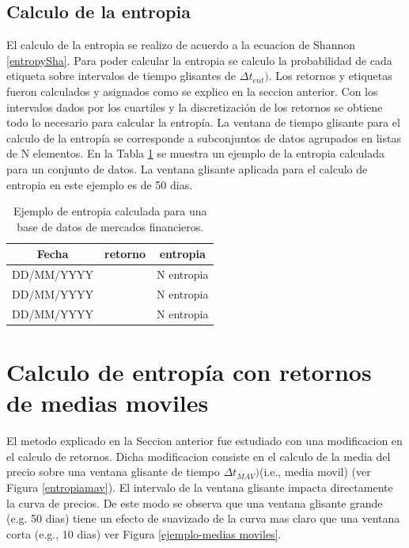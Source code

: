\subsection{Calculo de la entropia}
\label{sec_entropia}
El calculo de la entropia se realizo de acuerdo a la ecuacion de Shannon \ref{entropySha}.
Para poder calcular la entropia se calculo la probabilidad de cada etiqueta sobre intervalos de tiempo glisantes de $\Delta t_{ent})$.
Los retornos y etiquetas fueron calculados y asignados como se explico en la seccion anterior. 
Con los intervalos dados por los cuartiles y la discretización de los retornos se obtiene todo lo necesario para calcular la entropía.
La ventana de tiempo glisante para el calculo de la entropía se corresponde a subconjuntos de datos agrupados en listas de N elementos.
En la Tabla \ref{entropytable} se muestra un ejemplo de la entropia calculada para un conjunto de datos. 
La ventana glisante aplicada para el calculo de entropia en este ejemplo es de 50 dias.

\begin{table}
	\begin{center}
	\begin{tabular}{|c|c|c|}
		\hline 
		Fecha & retorno & entropia \\ 
		\hline 
		DD/MM/YYYY & $$$$ & N entropia\\ 
		DD/MM/YYYY & $$$$ & N entropia\\ 
		DD/MM/YYYY & $$$$ & N entropia\\ 
		\hline 
	\end{tabular} 
	\label{entropytable}
	\caption{Ejemplo de entropia calculada para una base de datos de mercados financieros.}
\end{center}
\end{table}




\section{Calculo de entropía con retornos de medias moviles}
\label{metodo_MAV}
El metodo explicado en la Seccion anterior fue estudiado con una modificacion en el calculo de retornos.
Dicha modificacion consiste en el calculo de la media del precio sobre una ventana glisante de tiempo $\Delta t_{MAV})$(i.e., media movil) (ver Figura \ref{entropiamav}). 
El intervalo de la ventana glisante impacta directamente la curva de precios.
De este modo se observa que una ventana glisante grande (e.g. 50 dias) tiene un efecto de suavizado de la curva mas claro que una ventana corta (e.g., 10 dias) ver Figura \ref{ejemplo-medias moviles}. 

